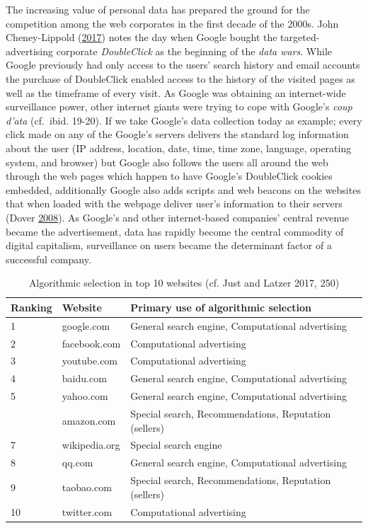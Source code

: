\documentclass[12pt,twoside]{report}
\begin{document}
The increasing value of personal data has prepared the ground for the competition among the web corporates in the first decade of the 2000s. John Cheney-Lippold (\protect\hyperlink{ref-Cheney2017}{2017}) notes the day when Google bought the targeted-advertising corporate \emph{DoubleClick} as the beginning of the \emph{data wars}. While Google previously had only access to the users' search history and email accounts the purchase of DoubleClick enabled access to the history of the visited pages as well as the timeframe of every visit. As Google was obtaining an internet-wide surveillance power, other internet giants were trying to cope with Google's \emph{coup d'ata} (cf.~ibid. 19-20). If we take Google's data collection today as example; every click made on any of the Google's servers delivers the standard log information about the user (IP address, location, date, time, time zone, language, operating system, and browser) but Google also follows the users all around the web through the web pages which happen to have Google's DoubleClick cookies embedded, additionally Google also adds scripts and web beacons on the websites that when loaded with the webpage deliver user's information to their servers (Dover \protect\hyperlink{ref-Dover2008}{2008}). As Google's and other internet-based companies' central revenue became the advertisement, data has rapidly become the central commodity of digital capitalism, surveillance on users became the determinant factor of a successful company.

\begin{table}[t]

\caption{\label{tab:abc}Algorithmic selection in top 10 websites (cf. Just and Latzer 2017, 250)}
\centering
\begin{tabular}{lll}
\toprule
Ranking & Website & Primary use of algorithmic selection\\
\midrule
1 & google.com & General search engine, Computational advertising\\
2 & facebook.com & Computational advertising\\
3 & youtube.com & Computational advertising\\
4 & baidu.com & General search engine, Computational advertising\\
5 & yahoo.com & General search engine, Computational advertising\\
\addlinespace
6 & amazon.com & Special search, Recommendations, Reputation (sellers)\\
7 & wikipedia.org & Special search engine\\
8 & qq.com & General search engine, Computational advertising\\
9 & taobao.com & Special search, Recommendations, Reputation (sellers)\\
10 & twitter.com & Computational advertising\\
\bottomrule
\end{tabular}
\end{table}
\end{document}
